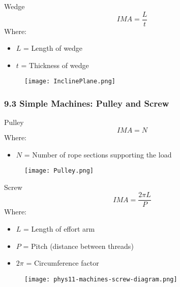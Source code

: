\documentclass{beamer}
\begin{document}
\begin{frame}


\begin{block}{Wedge}
$$IMA = \frac{L}{t}$$
Where:
\begin{itemize}
\item $L$ = Length of wedge
\item $t$ = Thickness of wedge
\end{itemize}
\end{block}
\begin{figure}
    \centering
    \texttt{[image: InclinePlane.png]}
\end{figure}
\end{frame}

\begin{frame}
\frametitle{9.3 Simple Machines: Pulley and Screw}
\begin{block}{Pulley}
$$IMA = N$$
Where:
\begin{itemize}
\item $N$ = Number of rope sections supporting the load
\end{itemize}
\end{block}
\begin{figure}
    \centering
    \texttt{[image: Pulley.png]}
\end{figure}
\end{frame}

\begin{frame}
\begin{block}{Screw}
$$IMA = \frac{2\pi L}{P}$$
Where:
\begin{itemize}
\item $L$ = Length of effort arm
\item $P$ = Pitch (distance between threads)
\item $2\pi$ = Circumference factor
\end{itemize}
\end{block}
\begin{figure}
    \centering
    \texttt{[image: phys11-machines-screw-diagram.png]}
\end{figure}
\end{frame}
\end{document}

